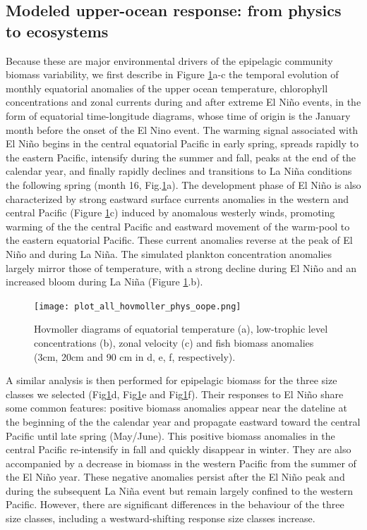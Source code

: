 \subsection{Modeled upper-ocean response: from physics to ecosystems}

Because these are major environmental drivers of the epipelagic community biomass variability, we first describe in Figure \ref{fig:hov_nemo_ape}a-c the temporal evolution of monthly equatorial anomalies of the upper ocean temperature, chlorophyll concentrations and zonal currents during and after extreme El Niño events, in the form of equatorial time-longitude diagrams, whose time of origin is the January month before the onset of the El Nino event. The warming signal associated with El Niño begins in the central equatorial Pacific in early spring, spreads rapidly to the eastern Pacific, intensify during the summer and fall, peaks at the end of the calendar year, and finally rapidly declines and transitions to La Niña conditions the following spring (month 16, Fig.\ref{fig:hov_nemo_ape}a). The development phase of El Niño is also characterized by strong  eastward surface currents anomalies in the western and central Pacific (Figure \ref{fig:hov_nemo_ape}c) induced by anomalous westerly winds, promoting warming of the the central Pacific and eastward movement of the warm-pool to the eastern equatorial Pacific. These current anomalies reverse at the peak of El Niño and during La Niña. The simulated plankton concentration anomalies largely mirror those of temperature, with a strong decline during El Niño and an increased bloom during La Niña (Figure \ref{fig:hov_nemo_ape}.b). 


\begin{figure}[h!tp]
	\centering
	\texttt{[image: plot\_all\_hovmoller\_phys\_oope.png]}	
	\caption{Hovmoller diagrams of equatorial temperature (a), low-trophic level concentrations (b), zonal velocity (c) and fish biomass anomalies (3cm, 20cm and 90 cm in d, e, f, respectively).}	
	\label{fig:hov_nemo_ape}
\end{figure}

A similar analysis is then performed for epipelagic biomass for the three size classes we selected (Fig\ref{fig:hov_nemo_ape}d, Fig\ref{fig:hov_nemo_ape}e and Fig\ref{fig:hov_nemo_ape}f). Their responses to El Niño share some common features: positive biomass anomalies appear near the dateline at the beginning of the the calendar year and propagate eastward toward the central Pacific until late spring (May/June). This positive biomass anomalies in the central Pacific re-intensify in fall and quickly disappear in winter. They are also accompanied by a decrease in biomass in the western Pacific from the summer of the El Niño year. These negative anomalies persist after the El Niño peak and during the subsequent La Niña event but remain largely confined to the western Pacific. However, there are significant differences in the behaviour of the three size classes, including a westward-shifting response size classes increase.

